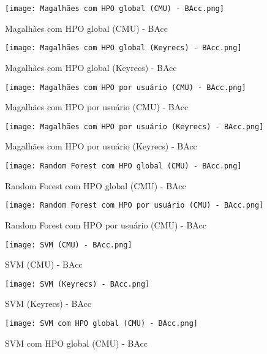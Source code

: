 \begin{figure}[H]
    \caption{Magalhães com HPO global (CMU) - BAcc}
    \label{fig:Magalhães com HPO global (CMU) - BAcc}
    \centering
    \texttt{[image: Magalhães com HPO global (CMU) - BAcc.png]}
\end{figure}
\begin{figure}[H]
    \caption{Magalhães com HPO global (Keyrecs) - BAcc}
    \label{fig:Magalhães com HPO global (Keyrecs) - BAcc}
    \centering
    \texttt{[image: Magalhães com HPO global (Keyrecs) - BAcc.png]}
\end{figure}
\begin{figure}[H]
    \caption{Magalhães com HPO por usuário (CMU) - BAcc}
    \label{fig:Magalhães com HPO por usuário (CMU) - BAcc}
    \centering
    \texttt{[image: Magalhães com HPO por usuário (CMU) - BAcc.png]}
\end{figure}
\begin{figure}[H]
    \caption{Magalhães com HPO por usuário (Keyrecs) - BAcc}
    \label{fig:Magalhães com HPO por usuário (Keyrecs) - BAcc}
    \centering
    \texttt{[image: Magalhães com HPO por usuário (Keyrecs) - BAcc.png]}
\end{figure}
\begin{figure}[H]
    \caption{Random Forest com HPO global (CMU) - BAcc}
    \label{fig:Random Forest com HPO global (CMU) - BAcc}
    \centering
    \texttt{[image: Random Forest com HPO global (CMU) - BAcc.png]}
\end{figure}
\begin{figure}[H]
    \caption{Random Forest com HPO por usuário (CMU) - BAcc}
    \label{fig:Random Forest com HPO por usuário (CMU) - BAcc}
    \centering
    \texttt{[image: Random Forest com HPO por usuário (CMU) - BAcc.png]}
\end{figure}
\begin{figure}[H]
    \caption{SVM (CMU) - BAcc}
    \label{fig:SVM (CMU) - BAcc}
    \centering
    \texttt{[image: SVM (CMU) - BAcc.png]}
\end{figure}
\begin{figure}[H]
    \caption{SVM (Keyrecs) - BAcc}
    \label{fig:SVM (Keyrecs) - BAcc}
    \centering
    \texttt{[image: SVM (Keyrecs) - BAcc.png]}
\end{figure}
\begin{figure}[H]
    \caption{SVM com HPO global (CMU) - BAcc}
    \label{fig:SVM com HPO global (CMU) - BAcc}
    \centering
    \texttt{[image: SVM com HPO global (CMU) - BAcc.png]}
\end{figure}
